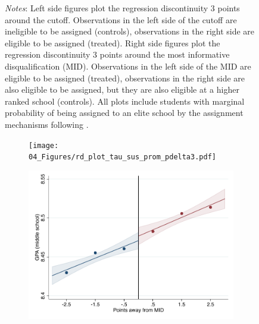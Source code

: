 \documentclass[oneside,11pt]{article}
\begin{document}
\begin{figure}[H]
\footnotesize
\textit{Notes}: Left side figures plot the regression discontinuity 3 points around the cutoff. Observations in the left side of the cutoff are ineligible to be assigned (controls), observations in the right side are eligible to be assigned (treated). Right side figures plot the regression discontinuity 3 points around the most informative disqualification (MID). Observations in the left side of the MID are eligible to be assigned (treated), observations in the right side are also eligible to be assigned, but they are also eligible at a higher ranked school (controls). All plots include students with marginal probability of being assigned to an elite school by the assignment mechanisms following \citet{abdulkadirouglu2022breaking}. 
\end{figure}

\begin{figure}[H]

    \ContinuedFloat
    \caption{(Continued) RD plots for balance variables across those assigned to either UNAM or IPN high-school, and those who are not\label{fig:Balance_rd_plot_elite_2}}
    \begin{center}
    
    \begin{subfigure}{0.475\textwidth}
        \centering
        \texttt{[image: 04\_Figures/rd\_plot\_tau\_sus\_prom\_pdelta3.pdf]}
    \end{subfigure}
    \begin{subfigure}{0.475\textwidth}
        \centering
        \includegraphics[width=\textwidth]{04_Figures/rd_plot_mid_sus_prom_pdelta3.pdf}
    \end{subfigure}


\end{center}
\end{figure}
\end{document}
